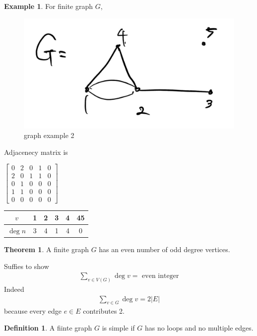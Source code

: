 \documentclass{article}
\theoremstyle{definition}
\newtheorem{defn}{Definition}[]
\newtheorem{thm}{Theorem}[]
\newtheorem{ex}{Example}[]
\newenvironment{pf*}{\pushQED{\qed}\pf}{\popQED\endpf}
\begin{document}
\begin{ex}
    For finite graph $G$, 
    \begin{figure}[!h]
        \centerline{\includegraphics[width=0.5\columnwidth]{graph_ex_2.jpg}}
        \caption{graph example 2}
        \label{grex2} 
    \end{figure}
    Adjacenecy matrix is 
    \begin{center}
        $\begin{bmatrix}
            0 & 2 & 0 & 1 & 0 \\
            2 & 0 & 1 & 1 & 0 \\
            0 & 1 & 0 & 0 & 0 \\
            1 & 1 & 0 & 0 & 0 \\
            0 & 0 & 0 & 0 & 0
        \end{bmatrix}$
    \end{center}
    \begin{center}
        \begin{tabular}{c|ccccc}
            $v$ & 1 & 2 & 3 &  4& 45 \\ 
            \hline 
            $\deg n$ & 3 & 4 & 1 & 4 & 0
        \end{tabular}
    \end{center}

\end{ex}
\begin{thm}
    A finite graph $G$ has an even number of odd degree vertices.
\end{thm}
\begin{pf*}
    Suffies to show
    \begin{align*}
        \sum_{v \in V(G)} \deg v = \text{ even integer}
    \end{align*}
    Indeed 
    \begin{align*}
        \sum_{v \in G}  \deg v = 2 \vert E \vert
    \end{align*}
    because every edge $e \in E$ contributes 2. 
\end{pf*}
\begin{defn}
    A fiinte graph $G$ is simple if $G$ has no loops and no multiple edges.
\end{defn}
\end{document}
